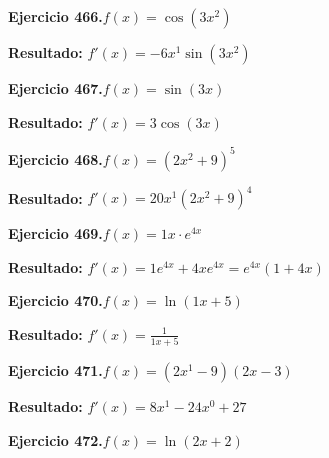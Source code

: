 \documentclass[10pt,a4paper]{article}
\begin{document}
\newpage
\begin{ejbox}
\textbf{Ejercicio 466.}\quad $f(x) = \cos(3x^{2})$
\end{ejbox}

\begin{solbox}
\textbf{Resultado:} \(\displaystyle f'(x) = -6x^{1}\sin(3x^{2})\)
\end{solbox}

\begin{ejbox}
\textbf{Ejercicio 467.}\quad $f(x) = \sin(3x)$
\end{ejbox}

\begin{solbox}
\textbf{Resultado:} \(\displaystyle f'(x) = 3\cos(3x)\)
\end{solbox}

\begin{ejbox}
\textbf{Ejercicio 468.}\quad $f(x) = (2x^{2} +9)^{5}$
\end{ejbox}

\begin{solbox}
\textbf{Resultado:} \(\displaystyle f'(x) = 20x^{1}(2x^{2} +9)^{4}\)
\end{solbox}

\newpage
\begin{ejbox}
\textbf{Ejercicio 469.}\quad $f(x) = 1x \cdot e^{4x}$
\end{ejbox}

\begin{solbox}
\textbf{Resultado:} \(\displaystyle f'(x) = 1e^{4x} + 4xe^{4x} = e^{4x}(1 + 4x)\)
\end{solbox}

\begin{ejbox}
\textbf{Ejercicio 470.}\quad $f(x) = \ln(1x + 5)$
\end{ejbox}

\begin{solbox}
\textbf{Resultado:} \(\displaystyle f'(x) = \frac{1}{1x + 5}\)
\end{solbox}

\begin{ejbox}
\textbf{Ejercicio 471.}\quad $f(x) = (2x^{1} -9)(2x -3)$
\end{ejbox}

\begin{solbox}
\textbf{Resultado:} \(\displaystyle f'(x) = 8x^{1} -24x^{0} +27\)
\end{solbox}

\newpage
\begin{ejbox}
\textbf{Ejercicio 472.}\quad $f(x) = \ln(2x + 2)$
\end{ejbox}
\end{document}
